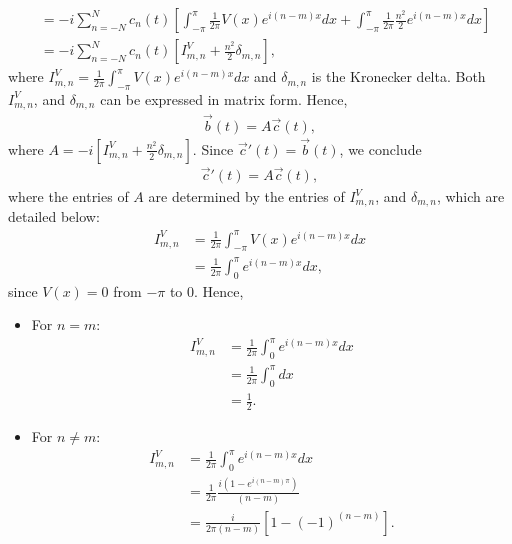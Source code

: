 \begin{questions}
\begin{solution}
\begin{align*}
&= -i\sum_{n=-N}^Nc_n(t)\left[\int_{-\pi}^{\pi}\frac{1}{2\pi} V (x) e^{i(n-m)x} dx + \int_{-\pi}^{\pi}\frac{1}{2\pi}\frac{n^2}{2}e^{i(n-m)x} dx \right] \\
&= -i\sum_{n=-N}^Nc_n(t)\left[I^V_{m,n} + \frac{n^2}{2}\delta_{m,n} \right],
\end{align*}
where $I^V_{m,n} = \frac{1}{2\pi}\int_{-\pi}^{\pi} V (x) e^{i(n-m)x} dx$ and $\delta_{m,n}$ is the Kronecker delta. Both $I^V_{m,n}$, and $\delta_{m,n}$ can be expressed in matrix form. Hence,
\begin{align*}
\overrightarrow{b} (t) = A\overrightarrow{c}(t),
\end{align*}
where $A = -i\left[I^V_{m,n} + \frac{n^2}{2}\delta_{m,n} \right]$. Since $\overrightarrow{c}' (t) =\overrightarrow{b} (t)$, we conclude
\begin{align*}
\overrightarrow{c}' (t) = A\overrightarrow{c}(t),
\end{align*}
where the entries of $A$ are determined by the entries of $I^V_{m,n}$, and $\delta_{m,n}$, which are detailed below:
\begin{align*}
I^V_{m,n} &= \frac{1}{2\pi}\int_{-\pi}^{\pi} V (x) e^{i(n-m)x} dx\\
&= \frac{1}{2\pi}\int_{0}^{\pi} e^{i(n-m)x} dx,
\end{align*}
since $V(x) = 0$ from $-\pi$ to $0$. Hence,
\begin{itemize}
\item For $n=m$:
\begin{align*}
I^V_{m,n} &= \frac{1}{2\pi}\int_{0}^{\pi} e^{i(n-m)x} dx\\
&= \frac{1}{2\pi}\int_{0}^{\pi} dx\\
&= \frac{1}{2}.
\end{align*}
\item For $n \neq m$:
\begin{align*}
I^V_{m,n} &= \frac{1}{2\pi}\int_{0}^{\pi} e^{i(n-m)x} dx\\
&= \frac{1}{2\pi}\frac{i\left(1-e^{i(n-m)\pi}\right)}{(n-m)}\\
&= \frac{i}{2\pi(n-m)}\left[ 1-(-1)^{(n-m)}\right].
\end{align*}
\end{itemize}


\end{solution}
\end{questions}